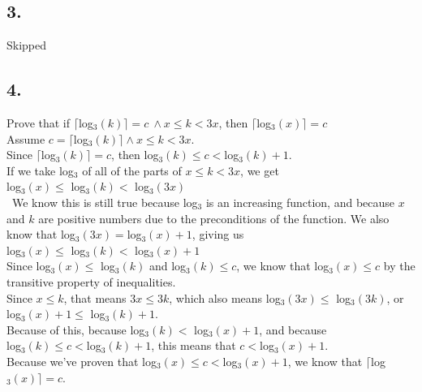 \documentclass{article}
\begin{document}
\subsection*{3.}
Skipped
\subsection*{4.}
Prove that if $\lceil$log$_3(k)\rceil=c\ \land x\leq k<3x$, then $\lceil$log$_3(x)\rceil =c$\\
Assume $c= \lceil$log$_3(k)\rceil\land x\leq k<3x$.\\
Since $\lceil$log$_3(k)\rceil=c$, then log$_3(k)\leq c <$log$_3(k)+1$.\\
If we take log$_3$ of all of the parts of $x\leq k<3x$, we get \\log$_3(x)\leq $ log$_3(k)<$ log$_3(3x)$\\\
We know this is still true because log$_3$ is an increasing function, and because $x$ and $k$ are positive numbers due to the preconditions of the function.
We also know that log$_3(3x)=$log$_3(x)+1$, giving us\\
log$_3(x)\leq $ log$_3(k)<$ log$_3(x)+1$\\
Since log$_3(x)\leq $ log$_3(k)$ and log$_3(k)\leq c$, we know that log$_3(x)\leq c$ by the transitive property of inequalities.\\
Since $x\leq k$, that means $3x\leq 3k$, which also means log$_3(3x) \leq$ log$_3(3k)$, or log$_3(x)+1 \leq$ log$_3(k)+1$.\\
Because of this, because log$_3(k) <$ log$_3(x)+1$, and because \\log$_3(k)\leq c <$log$_3(k)+1$, this means that $c<$log$_3(x)+1$.\\
Because we've proven that log$_3(x)\leq c<$log$_3(x)+1$, we know that $\lceil$log$_3(x)\rceil =c$.
\end{document}
